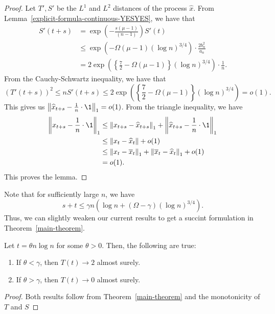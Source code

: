 \documentclass[12pt]{article}
\begin{document}
\begin{proof}
	Let $T', S'$ be the $L^1$ and $L^2$ distances of the process $\widehat{x}$. From Lemma~\ref{explicit-formula-continuous-YESYES}, we have that
	\begin{align*}
		S'(t+s) & = \exp \left ( - \frac{s (\mu-1)}{(n-1)} \right ) S'(t) \\
		& \leq \exp(- \Omega (\mu-1) (\log n)^{3/4}) \cdot \frac{2b_n^2}{a_n} \\
		& = 2 \exp \left ( \left \{ \frac{7}{2} - \Omega (\mu - 1) \right \} (\log n)^{3/4} \right ) \cdot \frac{1}{n}.
	\end{align*}
	From the Cauchy-Schwartz inequality, we have that
	\[
		(T'(t+s))^2 \leq n S'(t+s) \leq 2 \exp \left ( \left \{ \frac{7}{2} - \Omega (\mu - 1) \right \} (\log n)^{3/4} \right ) = o(1).
	\]
	This gives us $\norm{\widehat{x}_{t+s} - \frac{1}{n} \cdot \1}_1 = o(1)$. From the triangle inequality, we have
	\begin{align*}
		\norm{x_{t+s} - \frac{1}{n} \cdot \1}_1 & \leq \norm{x_{t+s} - \widehat{x}_{t+s}}_1 + \norm{\widehat{x}_{t+s} - \frac{1}{n} \cdot \1}_1 \\
		& \leq \norm{x_t - \widehat{x}_t} + o(1) \\
		& \leq \norm{x_t - \overline{x}_t}_1 + \norm{\overline{x}_t - \widehat{x}_t}_1 + o(1) \\
		& = o(1).
	\end{align*}
	This proves the lemma. 
\end{proof}

Note that for sufficiently large $n$, we have 
\[
	s + t \leq \gamma n \left (\log n + (\Omega - \gamma) (\log n)^{3/4} \right ).
\]
Thus, we can slightly weaken our current results to get a succint formulation in Theorem~\ref{main-theorem}. 

\begin{thm} \label{main-theorem}
	Let $t = \theta n \log n$ for some $\theta > 0$. Then, the following are true:
	\begin{enumerate}[label = (\alph*)]
		\item If $\theta < \gamma$, then $T(t) \to 2$ almost surely. 
		\item If $\theta > \gamma$, then $T(t) \to 0$ almost surely. 
	\end{enumerate}
\end{thm}

\begin{proof}
	Both results follow from Theorem~\ref{main-theorem} and the monotonicity of $T$ and $S$
\end{proof}
\end{document}
